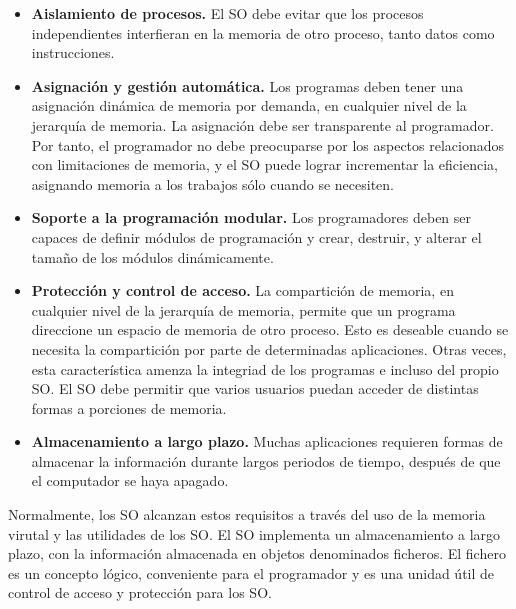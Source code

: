 \documentclass{article}
\begin{document}
				\begin{itemize}
				\item \textbf{Aislamiento de procesos.} El SO debe evitar que los procesos independientes interfieran en la memoria de otro proceso, tanto datos como instrucciones.
				\item \textbf{Asignación y gestión automática.} Los programas deben tener una asignación dinámica de memoria por demanda, en cualquier nivel de la jerarquía de memoria. La asignación debe ser transparente al programador. Por tanto, el programador no debe preocuparse por los aspectos relacionados con limitaciones de memoria, y el SO puede lograr incrementar la eficiencia, asignando memoria a los trabajos sólo cuando se necesiten.
				\item \textbf{Soporte a la programación modular.} Los programadores deben ser capaces de definir módulos de programación y crear, destruir, y alterar el tamaño de los módulos dinámicamente.
				\item \textbf{Protección y control de acceso.} La compartición de memoria, en cualquier nivel de la jerarquía de memoria, permite que un programa direccione un espacio de memoria de otro proceso. Esto es deseable cuando se necesita la compartición por parte de determinadas aplicaciones. Otras veces, esta característica amenza la integriad de los programas e incluso del propio SO. El SO debe permitir que varios usuarios puedan acceder de distintas formas a porciones de memoria.
				\item \textbf{Almacenamiento a largo plazo.} Muchas aplicaciones requieren formas de almacenar la información durante largos periodos de tiempo, después de que el computador se haya apagado.
				\end{itemize}
				
				Normalmente, los SO alcanzan estos requisitos a través del uso de la memoria virutal y las utilidades de los SO. El SO implementa un almacenamiento a largo plazo, con la información almacenada en objetos denominados ficheros. El fichero es un concepto lógico, conveniente para el programador y es una unidad útil de control de acceso y protección para los SO. \\
				
\end{document}

